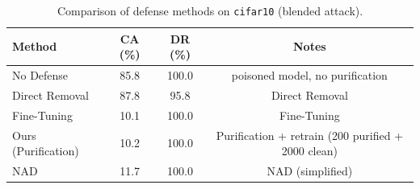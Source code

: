 \begin{table}[htbp]
\centering
\caption{Comparison of defense methods on \texttt{cifar10} (blended attack).}
\label{tab:results}
\begin{tabular}{lccc}
\toprule
Method & CA (\%) & DR (\%) & Notes \\
\midrule
  No Defense & 85.8 & 100.0 & poisoned model, no purification \\
  Direct Removal & 87.8 & 95.8 & Direct Removal \\
  Fine-Tuning & 10.1 & 100.0 & Fine-Tuning \\
  Ours (Purification) & 10.2 & 100.0 & Purification + retrain (200 purified + 2000 clean) \\
  NAD & 11.7 & 100.0 & NAD (simplified) \\
\bottomrule
\end{tabular}
\end{table}